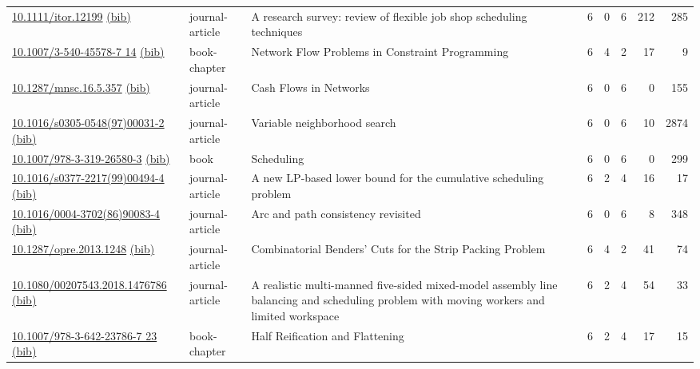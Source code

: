 {\begin{longtable}{p{5cm}lp{11cm}rrrrr}
\href{http://dx.doi.org/10.1111/itor.12199}{10.1111/itor.12199} \href{https://www.doi2bib.org/bib/10.1111/itor.12199}{(bib)} & journal-article & A research survey: review of flexible job shop scheduling techniques & 6 & 0 & 6 & 212 & 285 \\
\href{http://dx.doi.org/10.1007/3-540-45578-7_14}{10.1007/3-540-45578-7 14} \href{https://www.doi2bib.org/bib/10.1007/3-540-45578-7_14}{(bib)} & book-chapter & Network Flow Problems in Constraint Programming & 6 & 4 & 2 & 17 & 9 \\
\href{http://dx.doi.org/10.1287/mnsc.16.5.357}{10.1287/mnsc.16.5.357} \href{https://www.doi2bib.org/bib/10.1287/mnsc.16.5.357}{(bib)} & journal-article & Cash Flows in Networks & 6 & 0 & 6 & 0 & 155 \\
\href{http://dx.doi.org/10.1016/s0305-0548(97)00031-2}{10.1016/s0305-0548(97)00031-2} \href{https://www.doi2bib.org/bib/10.1016/s0305-0548(97)00031-2}{(bib)} & journal-article & Variable neighborhood search & 6 & 0 & 6 & 10 & 2874 \\
\href{http://dx.doi.org/10.1007/978-3-319-26580-3}{10.1007/978-3-319-26580-3} \href{https://www.doi2bib.org/bib/10.1007/978-3-319-26580-3}{(bib)} & book & Scheduling & 6 & 0 & 6 & 0 & 299 \\
\href{http://dx.doi.org/10.1016/s0377-2217(99)00494-4}{10.1016/s0377-2217(99)00494-4} \href{https://www.doi2bib.org/bib/10.1016/s0377-2217(99)00494-4}{(bib)} & journal-article & A new LP-based lower bound for the cumulative scheduling problem & 6 & 2 & 4 & 16 & 17 \\
\href{http://dx.doi.org/10.1016/0004-3702(86)90083-4}{10.1016/0004-3702(86)90083-4} \href{https://www.doi2bib.org/bib/10.1016/0004-3702(86)90083-4}{(bib)} & journal-article & Arc and path consistency revisited & 6 & 0 & 6 & 8 & 348 \\
\href{http://dx.doi.org/10.1287/opre.2013.1248}{10.1287/opre.2013.1248} \href{https://www.doi2bib.org/bib/10.1287/opre.2013.1248}{(bib)} & journal-article & Combinatorial Benders' Cuts for the Strip Packing Problem & 6 & 4 & 2 & 41 & 74 \\
\href{http://dx.doi.org/10.1080/00207543.2018.1476786}{10.1080/00207543.2018.1476786} \href{https://www.doi2bib.org/bib/10.1080/00207543.2018.1476786}{(bib)} & journal-article & A realistic multi-manned five-sided mixed-model assembly line balancing and scheduling problem with moving workers and limited workspace & 6 & 2 & 4 & 54 & 33 \\
\href{http://dx.doi.org/10.1007/978-3-642-23786-7_23}{10.1007/978-3-642-23786-7 23} \href{https://www.doi2bib.org/bib/10.1007/978-3-642-23786-7_23}{(bib)} & book-chapter & Half Reification and Flattening & 6 & 2 & 4 & 17 & 15 \\

\end{longtable}}
